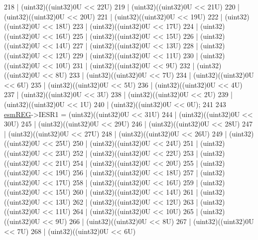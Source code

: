 \begin{DoxyCode}
218                    | (uint32)((uint32)0U << 22U)
219                    | (uint32)((uint32)0U << 21U)
220                    | (uint32)((uint32)0U << 20U)
221                    | (uint32)((uint32)0U << 19U)
222                    | (uint32)((uint32)0U << 18U)
223                    | (uint32)((uint32)0U << 17U)
224                    | (uint32)((uint32)0U << 16U)
225                    | (uint32)((uint32)0U << 15U)
226                    | (uint32)((uint32)0U << 14U)
227                    | (uint32)((uint32)0U << 13U)
228                    | (uint32)((uint32)0U << 12U)
229                    | (uint32)((uint32)0U << 11U)
230                    | (uint32)((uint32)0U << 10U)
231                    | (uint32)((uint32)0U <<  9U)
232                    | (uint32)((uint32)0U <<  8U)
233                    | (uint32)((uint32)0U <<  7U)
234                    | (uint32)((uint32)0U <<  6U)
235                    | (uint32)((uint32)0U <<  5U)
236                    | (uint32)((uint32)0U <<  4U)
237                    | (uint32)((uint32)0U <<  3U)
238                    | (uint32)((uint32)0U <<  2U)
239                    | (uint32)((uint32)0U <<  1U)
240                    | (uint32)((uint32)0U <<  0U);
241 
243     \mbox{\hyperlink{reg__esm_8h_a7c2e779f2973e0c2c9496a4796df10f1}{esmREG}}->IESR1 = (uint32)((uint32)0U << 31U)
244                   | (uint32)((uint32)0U << 30U)
245                   | (uint32)((uint32)0U << 29U)
246                   | (uint32)((uint32)0U << 28U)
247                   | (uint32)((uint32)0U << 27U)
248                   | (uint32)((uint32)0U << 26U)
249                   | (uint32)((uint32)0U << 25U)
250                   | (uint32)((uint32)0U << 24U)
251                   | (uint32)((uint32)0U << 23U)
252                   | (uint32)((uint32)0U << 22U)
253                   | (uint32)((uint32)0U << 21U)
254                   | (uint32)((uint32)0U << 20U)
255                   | (uint32)((uint32)0U << 19U)
256                   | (uint32)((uint32)0U << 18U)
257                   | (uint32)((uint32)0U << 17U)
258                   | (uint32)((uint32)0U << 16U)
259                   | (uint32)((uint32)0U << 15U)
260                   | (uint32)((uint32)0U << 14U)
261                   | (uint32)((uint32)0U << 13U)
262                   | (uint32)((uint32)0U << 12U)
263                   | (uint32)((uint32)0U << 11U)
264                   | (uint32)((uint32)0U << 10U)
265                   | (uint32)((uint32)0U <<  9U)
266                   | (uint32)((uint32)0U <<  8U)
267                   | (uint32)((uint32)0U <<  7U)
268                   | (uint32)((uint32)0U <<  6U)

\end{DoxyCode}
